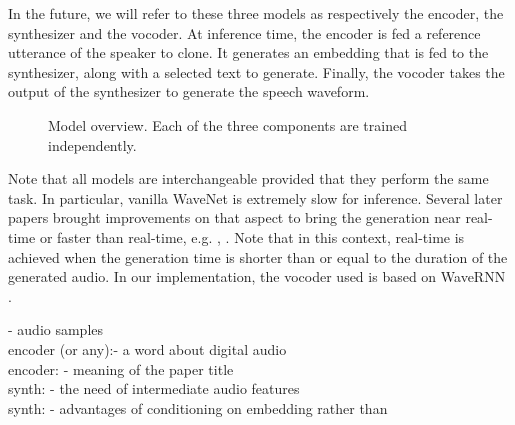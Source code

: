 \documentclass[a4paper, oneside, 12pt, english]{article}
\begin{document}
In the future, we will refer to these three models as respectively the encoder, the synthesizer and the vocoder. At inference time, the encoder is fed a reference utterance of the speaker to clone. It generates an embedding that is fed to the synthesizer, along with a selected text to generate. Finally, the vocoder takes the output of the synthesizer to generate the speech waveform. 

\begin{figure}[t]
	\centering
	\caption{Model overview.  Each of the three components are trained independently.}
	\label{fig.model_overview}
\end{figure}



Note that all models are interchangeable provided that they perform the same task. In particular, vanilla WaveNet is extremely slow for inference. Several later papers brought improvements on that aspect to bring the generation near real-time or faster than real-time, e.g. \citep{ParallelWaveNet}, \citep{FastWaveNet}. Note that in this context, real-time is achieved when the generation time is shorter than or equal to the duration of the generated audio. In our implementation, the vocoder used is based on WaveRNN \citep{WaveRNN}.





\color{red}
- audio samples \\
encoder (or any):- a word about digital audio  \\
encoder: - meaning of the paper title  \\
synth: - the need of intermediate audio features  \\
synth: - advantages of conditioning on embedding rather than \\
\color{black}


\clearpage

 




















\end{document}
